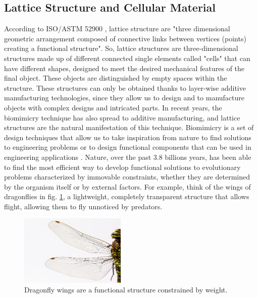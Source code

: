 \subsection{Lattice Structure and Cellular Material} \label{subsec:lattice}
According to ISO/ASTM 52900 \cite{international_standard_organization_isoastm_2015}, lattice structure are "three dimensional geometric arrangement composed of connective links between vertices (points) creating a functional structure". So, lattice structures are three-dimensional structures made up of different connected single elements called "cells" that can have different shapes, designed to meet the desired mechanical features of the final object. These objects are distinguished by empty spaces within the structure. These structures can only be obtained thanks to layer-wise additive manufacturing technologies, since they allow us to design and to manufacture objects with complex designs and intricated parts. In recent years, the biomimicry technique has also spread to additive manufacturing, and lattice structures are the natural manifestation of this technique. Biomimicry is a set of design techniques that allow us to take inspiration from nature to find solutions to engineering problems or to design functional components that can be used in engineering applications \cite{pathak_biomimicry_2019, du_plessis_beautiful_2019}. Nature, over the past 3.8 billions years, has been able to find the most efficient way to develop functional solutions to evolutionary problems characterized by immovable constraints, whether they are determined by the organism itself or by external factors. For example, think of the wings of dragonflies in fig. \ref{fig:dragonfly}, a lightweight, completely transparent structure that allows flight, allowing them to fly unnoticed by predators. 
\begin{figure}[H]
    \centering
    \includegraphics[width=0.45\textwidth]{Images/dragonfly-gf80b992d6_1280.jpg}
    \caption[Dragonfly wings.]{Dragonfly wings are a functional structure constrained by weight.}
    \label{fig:dragonfly}
\end{figure}
